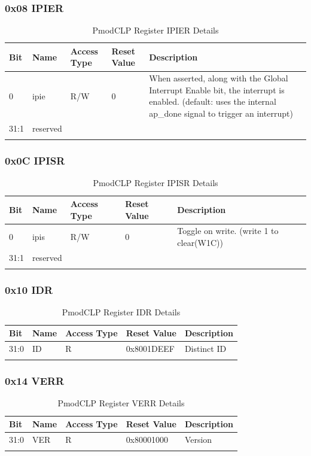 \subsubsection*{0x08 IPIER}
\begin{longtable}{|p{1.5cm}|p{3cm}|p{2cm}|p{2cm}|p{5cm}|}
\hline
\textbf{Bit} & \textbf{Name} & \textbf{Access Type} & \textbf{Reset Value} & \textbf{Description} \\
\hline
0 & ipie & R/W & 0 & When asserted, along with the Global Interrupt Enable bit, the interrupt is enabled. (default: uses the internal ap\_done signal to trigger an interrupt) \\
\hline
31:1 & reserved & & & \\
\hline
\caption{PmodCLP Register IPIER Details}
\end{longtable}

\subsubsection*{0x0C IPISR}
\begin{longtable}{|p{1.5cm}|p{3cm}|p{2cm}|p{2cm}|p{5cm}|}
\hline
\textbf{Bit} & \textbf{Name} & \textbf{Access Type} & \textbf{Reset Value} & \textbf{Description} \\
\hline
0 & ipis & R/W & 0 & Toggle on write. (write 1 to clear(W1C)) \\
\hline
31:1 & reserved & & & \\
\hline
\caption{PmodCLP Register IPISR Details}
\end{longtable}

\subsubsection*{0x10 IDR}
\begin{longtable}{|p{1.5cm}|p{3cm}|p{2cm}|p{2cm}|p{5cm}|}
\hline
\textbf{Bit} & \textbf{Name} & \textbf{Access Type} & \textbf{Reset Value} & \textbf{Description} \\
\hline
31:0 & ID & R & 0x8001DEEF & Distinct ID \\
\hline
\caption{PmodCLP Register IDR Details}
\end{longtable}

\subsubsection*{0x14 VERR}
\begin{longtable}{|p{1.5cm}|p{3cm}|p{2cm}|p{2cm}|p{5cm}|}
\hline
\textbf{Bit} & \textbf{Name} & \textbf{Access Type} & \textbf{Reset Value} & \textbf{Description} \\
\hline
31:0 & VER & R & 0x80001000 & Version \\
\hline
\caption{PmodCLP Register VERR Details}
\end{longtable}

